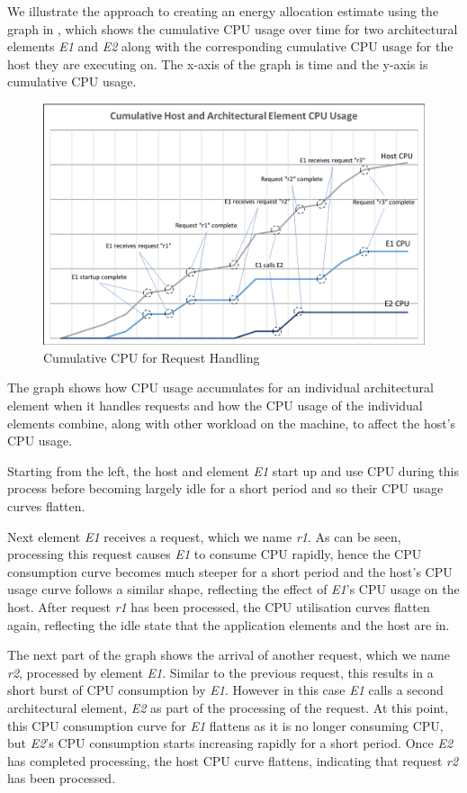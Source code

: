 We illustrate the approach to creating an energy allocation estimate using the graph in , which shows the cumulative CPU usage over time for two architectural elements \emph{E1} and \emph{E2} along with the corresponding cumulative CPU usage for the host they are executing on.  The x-axis of the graph is time and the y-axis is cumulative CPU usage.

\begin{figure}
\centering
\includegraphics[width=1.0\textwidth,trim={2 2 2 3},clip]{Figures/estimating-energy-cpuusage}
\caption{Cumulative CPU for Request Handling}
\label{figure:cpuusage}
\end{figure}

The graph shows how CPU usage accumulates for an individual architectural element when it handles requests and how the CPU usage of the individual elements combine, along with other workload on the machine, to affect the host's CPU usage.

Starting from the left, the host and element \emph{E1} start up and use CPU during this process before becoming largely idle for a short period and so their CPU usage curves flatten.

Next element \emph{E1} receives a request, which we name \emph{r1}.  As can be seen, processing this request causes \emph{E1} to consume CPU rapidly, hence the CPU consumption curve becomes much steeper for a short period and the host's CPU usage curve follows a similar shape, reflecting the effect of \emph{E1}'s CPU usage on the host.  After request \emph{r1} has been processed, the CPU utilisation curves flatten again, reflecting the idle state that the application elements and the host are in.

The next part of the graph shows the arrival of another request, which we name \emph{r2}, processed by element \emph{E1}.  Similar to the previous request, this results in a short burst of CPU consumption by \emph{E1}.  However in this case \emph{E1} calls a second architectural element, \emph{E2} as part of the processing of the request.  At this point, this CPU consumption curve for \emph{E1} flattens as it is no longer consuming CPU, but \emph{E2}'s CPU consumption starts increasing rapidly for a short period.  Once \emph{E2} has completed processing, the host CPU curve flattens, indicating that request \emph{r2} has been processed.

